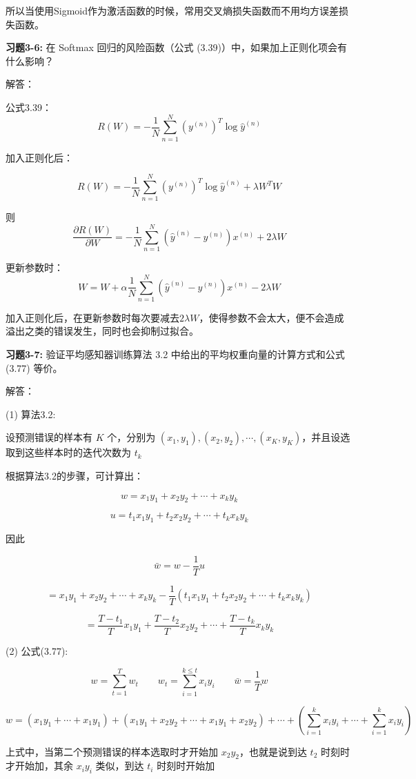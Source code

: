 所以当使用Sigmoid作为激活函数的时候，常用交叉熵损失函数而不用均方误差损失函数。


\noindent\textbf{习题3-6:} 在 Softmax 回归的风险函数（公式 (3.39)）中，如果加上正则化项会有什么影响？

解答：

公式3.39：\[R(W) = -\frac{1}{N}\sum_{n=1}^N(y^{(n)})^T\log\hat{y}^{(n)}\]

加入正则化后：

\[R(W) = -\frac{1}{N}\sum_{n=1}^N(y^{(n)})^T\log\hat{y}^{(n)} + \lambda W^TW\]

则\[\frac{\partial R(W)}{\partial W} = -\frac{1}{N}\sum_{n=1}^N(\hat{y}^{(n)} - y^{(n)})x^{(n)} + 2\lambda W\]

更新参数时：\[W = W + \alpha\frac{1}{N}\sum_{n=1}^N(\hat{y}^{(n)} - y^{(n)})x^{(n)} - 2\lambda W\]

加入正则化后，在更新参数时每次要减去$2\lambda W$，使得参数不会太大，便不会造成溢出之类的错误发生，同时也会抑制过拟合。


\noindent\textbf{习题3-7:} 验证平均感知器训练算法 3.2 中给出的平均权重向量的计算方式和公式 (3.77) 等价。

解答：

(1) 算法3.2:

设预测错误的样本有 $K$ 个，分别为 $(x_1,y_1), (x_2,y_2),\cdots,(x_K,y_K)$，并且设选取到这些样本时的迭代次数为 $t_k$

根据算法3.2的步骤，可计算出：

\[w = x_1y_1 + x_2y_2 + \cdots + x_ky_k\]

\[u = t_1x_1y_1 + t_2x_2y_2 + \cdots + t_kx_ky_k\]

因此

\[\bar{w} = w - \frac{1}{T}u\]

\[= x_1y_1 + x_2y_2 + \cdots + x_ky_k - \frac{1}{T}(t_1x_1y_1 + t_2x_2y_2 + \cdots + t_kx_ky_k)\]

\[= \frac{T-t_1}{T}x_1y_1 + \frac{T-t_2}{T}x_2y_2 + \cdots + \frac{T-t_k}{T}x_ky_k\]

(2) 公式(3.77):

\[w = \sum_{t=1}^T w_t \qquad w_t = \sum_{i=1}^{k\leq t} x_iy_i \qquad \bar{w} = \frac{1}{T}w\]

\[w = (x_1y_1 + \cdots + x_1y_1) + (x_1y_1 + x_2y_2 + \cdots + x_1y_1 + x_2y_2) + \cdots + (\sum_{i=1}^k x_iy_i + \cdots + \sum_{i=1}^k x_iy_i)\]

上式中，当第二个预测错误的样本选取时才开始加 $x_2y_2$，也就是说到达 $t_2$ 时刻时才开始加，其余 $x_iy_i$ 类似，到达 $t_i$ 时刻时开始加

